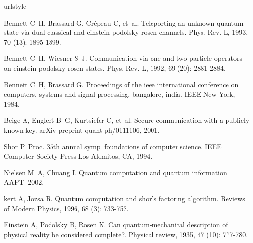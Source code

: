 \begin{thebibliography}{113}
	\providecommand{\natexlab}[1]{#1}
	\providecommand{\url}[1]{#1}
	\providecommand{\href}[2]{\url{#2}}
	\providecommand{\doi}[1]{DOI: \href{http://dx.doi.org/#1}{#1}}
	\expandafter\ifx\csname urlstyle\endcsname\relax\relax\else
	\fi
	\vbox{}
	\vbox{}

	Bennett C~H, Brassard G, Cr{\'e}peau C, et~al.
	\newblock Teleporting an unknown quantum state via dual classical and
	einstein-podolsky-rosen channels\allowbreak[J].
	\newblock Phys. Rev. L, 1993, 70 (13): 1895-1899.
	
	Bennett C~H, Wiesner S~J.
	\newblock Communication via one-and two-particle operators on
	einstein-podolsky-rosen states\allowbreak[J].
	\newblock Phys. Rev. L, 1992, 69 (20): 2881-2884.
	
	Bennett C~H, Brassard G.
	\newblock Proceedings of the ieee international conference on computers,
	systems and signal processing, bangalore, india\allowbreak[Z].
	 IEEE New York, 1984.
	
	Beige A, Englert B~G, Kurtsiefer C, et~al.
	\newblock Secure communication with a publicly known key\allowbreak[J].
	\newblock arXiv preprint quant-ph/0111106, 2001.
	
	Shor P.
	\newblock Proc. 35th annual symp. foundations of computer
	science\allowbreak[Z]. IEEE Computer Society Press Los Alomitos, CA, 1994.
	
	Nielsen M~A, Chuang I.
	\newblock Quantum computation and quantum information\allowbreak[Z]. AAPT, 2002.
	
	kert A, Jozsa R.
	\newblock Quantum computation and shor's factoring algorithm\allowbreak[J].
	\newblock Reviews of Modern Physics, 1996, 68 (3): 733-753.
	
	Einstein A, Podolsky B, Rosen N.
	\newblock Can quantum-mechanical description of physical reality be considered
	complete?\allowbreak[J].
	\newblock Physical review, 1935, 47 (10): 777-780.
	

\end{thebibliography}
